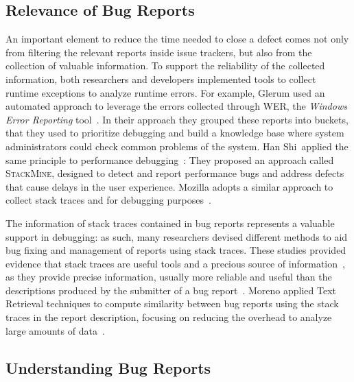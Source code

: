\subsection{Relevance of Bug Reports}

An important element to reduce the time needed to close a defect comes not only from filtering the relevant reports inside issue trackers, but also from the collection of valuable information.
To support the reliability of the collected information, both researchers and developers implemented tools to collect runtime exceptions to analyze runtime errors. For example, Glerum \etal used an automated approach to leverage the errors collected through WER, the \emph{Windows Error Reporting} tool~\cite{Glerum2009}. In their approach they grouped these reports into buckets, that they used to prioritize debugging and build a knowledge base where system administrators could check common problems of the system. Han Shi~\etal applied the same principle to performance debugging~\cite{Han2012}: They proposed an approach called \textsc{StackMine}, designed to detect and report performance bugs and address defects that cause delays in the user experience. Mozilla adopts a similar approach to collect stack traces and for debugging purposes~\cite{McLa2004}.

The information of stack traces contained in bug reports represents a valuable support in debugging: as such, many researchers devised different methods to aid bug fixing and management of reports using stack traces. These studies provided evidence that stack traces are useful tools and a precious source of information~\cite{Davie2013,Wang2013,Brod2005,Weis2007}, as they provide precise information, usually more reliable and useful than the descriptions produced by the submitter of a bug report~\cite{Ko2006}. Moreno \etal applied Text Retrieval techniques to compute similarity between bug reports using the stack traces in the report description, focusing on reducing the overhead to analyze large amounts of data~\cite{Moreno2014}.




\subsection{Understanding Bug Reports}

